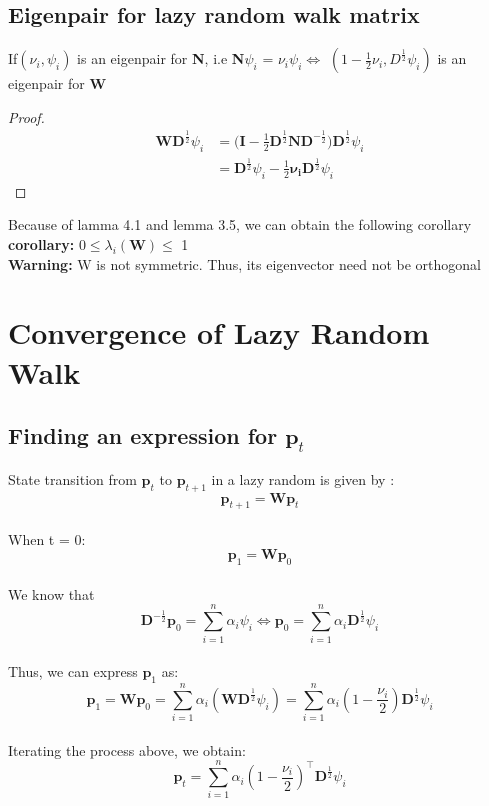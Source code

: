 \documentclass[11pt]{article}
\begin{document}
\subsection{Eigenpair for lazy random walk matrix}

\begin{lemma}
    If$( \nu_i,\psi_i)$ is an eigenpair for \textbf{N}, i.e \textbf{N}$\psi_i$ = $ \nu_i\psi_i \Leftrightarrow$ $(1-\frac{1}{2} \nu_i,D^{\frac{1}{2}}\psi_i)$ is an eigenpair for \textbf{W}\\
\end{lemma}
\begin{proof}
\begin{equation*}
    \begin{split}
     \mathbf{WD}^{\frac{1}{2}}\psi_i       
     &=\mathbf{(I}-\frac{1}{2}\mathbf{D}^{\frac{1}{2}}\mathbf{ND}^{-\frac{1}{2}})\mathbf{D}^{\frac{1}{2}}\psi_i\\
     &=\mathbf{D}^{\frac{1}{2}}\psi_i - \frac{1}{2} \mathbf{\nu_iD}^{\frac{1}{2}}\psi_i
    \end{split}
\end{equation*}
\end{proof}

Because of lamma 4.1 and lemma 3.5, we can obtain the following corollary\\
\textbf{corollary:} 0$\leq \lambda_i(\textbf{W}) \leq$ 1\\
\textbf{Warning:} W is not symmetric. Thus, its eigenvector need not be orthogonal\\

\section{Convergence of Lazy Random Walk}
\subsection{Finding an expression for $\mathbf{p}_t$}
State transition from $\mathbf{p}_t$ to $\mathbf{p}_{t+1}$ in a lazy random is given by :\\
$$\mathbf{p}_{t+1} = \mathbf{Wp}_t$$\\
When t = 0:
$$\mathbf{p}_1 = \mathbf{Wp}_0$$\\
We know that\\
$$\mathbf{D}^{-\frac{1}{2}}\mathbf{p}_0 = \sum_{i=1}^{n}\alpha_i\psi_i \Leftrightarrow \mathbf{p}_0 = \sum_{i=1}^{n}\alpha_i\mathbf{D}^{\frac{1}{2}}\psi_i$$\\
Thus, we can express $\mathbf{p}_1$ as:\\
$$\mathbf{p}_1 = \mathbf{Wp}_0 = \sum_{i=1}^{n}\alpha_i(\mathbf{WD}^{\frac{1}{2}}\psi_i) = \sum_{i=1}^{n}\alpha_i(1-\frac{\nu_i}{2})\mathbf{D}^{\frac{1}{2}}\psi_i$$\\
Iterating the process above, we obtain:\\
$$\mathbf{p}_t = \sum_{i=1}^{n}\alpha_i(1-\frac{\nu_i}{2})^\top \mathbf{D}^{\frac{1}{2}}\psi_i$$\\
\end{document}
